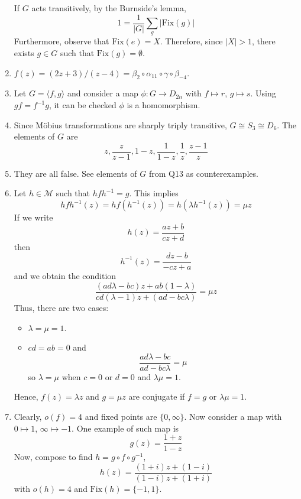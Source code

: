 \documentclass[10pt, a4paper, twoside]{report}
\begin{document}
\begin{enumerate}[{1.}]
    If \(G\) acts transitively, by the Burnside's lemma,
    \[1=\frac 1{|G|}\sum_g|\text{Fix}(g)|\]
    Furthermore, observe that \(\text{Fix}(e)=X\).
    Therefore, since \(|X|>1\), there exists \(g\in G\) such that \(\text{Fix}(g)=\emptyset\).
    \item  \(f(z)=(2z+3)/(z-4)=\beta_2\circ\alpha_{11}\circ\gamma\circ\beta_{-4}\).
    \item Let \(G=\langle f,g\rangle\) and consider a map \(\phi: G\to D_{2n}\) with \(f\mapsto r\), \(g\mapsto s\). Using \(gf=f^{-1}g\), it can be checked \(\phi\) is a homomorphism.
    \item Since Möbius transformations are sharply triply transitive, \(G\cong S_3\cong D_6\). The elements of \(G\) are
    \[z,\frac{z}{z-1},{1-z},\frac 1{1-z},\frac 1z,\frac{z-1}z\]
    \item They are all false. See elements of \(G\) from Q13 as counterexamples.
    \item Let \(h\in\mathcal{M}\) such that \(hfh^{-1}=g\). This implies
    \[hfh^{-1}(z)=hf(h^{-1}(z))=h(\lambda h^{-1}(z))=\mu z\]
    If we write 
    \[h(z)=\frac{az+b}{cz+d}\]
    then 
    \[h^{-1}(z)=\frac{dz-b}{-cz+a}\]
    and we obtain the condition 
    \[\frac{(ad\lambda-bc)z+ab(1-\lambda)}{cd(\lambda-1)z+(ad-bc\lambda)}=\mu z\]
    Thus, there are two cases:
    \begin{itemize}
        \item \(\lambda=\mu=1\).
        \item \(cd=ab=0\) and 
        \[\frac{ad\lambda-bc}{ad-bc\lambda}=\mu\]
        so \(\lambda=\mu\) when \(c=0\) or \(d=0\) and \(\lambda\mu=1\).
    \end{itemize}
    Hence, \(f(z)=\lambda z\) and \(g=\mu z\) are conjugate if \(f=g\) or \(\lambda\mu=1\).
    \item Clearly, \(o(f)=4\) and fixed points are \(\{0,\infty\}\). Now consider a map with \(0\mapsto 1\), \(\infty\mapsto -1\). One example of such map is 
    \[g(z)=\frac{1+z}{1-z}\]
    Now, compose to find \(h=g\circ f\circ g^{-1}\),
    \[h(z)=\frac{(1+i)z+(1-i)}{(1-i)z+(1+i)}\]
    with \(o(h)=4\) and \(\text{Fix}(h)=\{-1,1\}\).
\end{enumerate}
\end{document}
